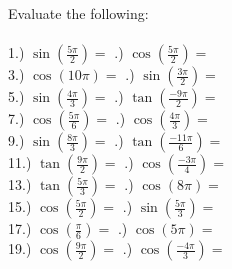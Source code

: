 \documentclass[12pt]{article}
\begin{document}
Evaluate the following:
\\\\

1.) $\sin(\frac{5\pi}{2}) = $ \underline{\hspace{2cm}} \indent\indent\indent{}.) $\cos(\frac{5\pi}{2}) = $ \underline{\hspace{2cm}} \\

3.) $\cos(10\pi) = $ \underline{\hspace{2cm}} \indent\indent\indent{}.) $\sin(\frac{3\pi}{2}) = $ \underline{\hspace{2cm}} \\

5.) $\sin(\frac{4\pi}{3}) = $ \underline{\hspace{2cm}} \indent\indent\indent{}.) $\tan(\frac{-9\pi}{2}) = $ \underline{\hspace{2cm}} \\

7.) $\cos(\frac{5\pi}{6}) = $ \underline{\hspace{2cm}} \indent\indent\indent{}.) $\cos(\frac{4\pi}{3}) = $ \underline{\hspace{2cm}} \\

9.) $\sin(\frac{8\pi}{3}) = $ \underline{\hspace{2cm}} \indent\indent\indent{}.) $\tan(\frac{-11\pi}{6}) = $ \underline{\hspace{2cm}} \\

11.) $\tan(\frac{9\pi}{2}) = $ \underline{\hspace{2cm}} \indent\indent\indent{}.) $\cos(\frac{-3\pi}{4}) = $ \underline{\hspace{2cm}} \\

13.) $\tan(\frac{5\pi}{3}) = $ \underline{\hspace{2cm}} \indent\indent\indent{}.) $\cos(8\pi) = $ \underline{\hspace{2cm}} \\

15.) $\cos(\frac{5\pi}{2}) = $ \underline{\hspace{2cm}} \indent\indent\indent{}.) $\sin(\frac{5\pi}{3}) = $ \underline{\hspace{2cm}} \\

17.) $\cos(\frac{\pi}{6}) = $ \underline{\hspace{2cm}} \indent\indent\indent{}.) $\cos(5\pi) = $ \underline{\hspace{2cm}} \\

19.) $\cos(\frac{9\pi}{2}) = $ \underline{\hspace{2cm}} \indent\indent\indent{}.) $\cos(\frac{-4\pi}{3}) = $ \underline{\hspace{2cm}} \\
\end{document}
